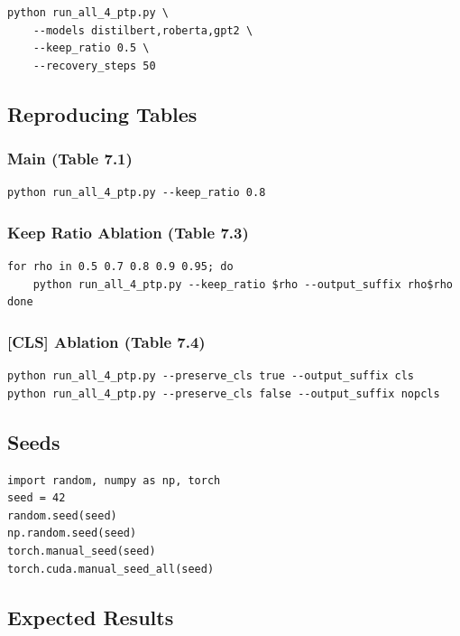 \begin{lstlisting}
python run_all_4_ptp.py \
    --models distilbert,roberta,gpt2 \
    --keep_ratio 0.5 \
    --recovery_steps 50
\end{lstlisting}

\subsection{Reproducing Tables}

\subsubsection{Main (Table 7.1)}
\begin{lstlisting}
python run_all_4_ptp.py --keep_ratio 0.8
\end{lstlisting}

\subsubsection{Keep Ratio Ablation (Table 7.3)}
\begin{lstlisting}
for rho in 0.5 0.7 0.8 0.9 0.95; do
    python run_all_4_ptp.py --keep_ratio $rho --output_suffix rho$rho
done
\end{lstlisting}

\subsubsection{[CLS] Ablation (Table 7.4)}
\begin{lstlisting}
python run_all_4_ptp.py --preserve_cls true --output_suffix cls
python run_all_4_ptp.py --preserve_cls false --output_suffix nopcls
\end{lstlisting}

\subsection{Seeds}

\begin{lstlisting}
import random, numpy as np, torch
seed = 42
random.seed(seed)
np.random.seed(seed)
torch.manual_seed(seed)
torch.cuda.manual_seed_all(seed)
\end{lstlisting}

\subsection{Expected Results}

